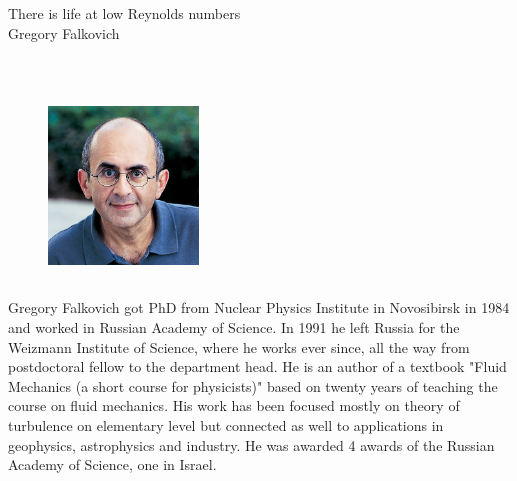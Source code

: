     { 
			{There is life at low Reynolds numbers} \\ 			
    \normalfont\small Gregory Falkovich }
    
    {  \\    
    } 
      {  } 
	\vspace{1cm} 
	\begin{figure}
		\vspace{-20pt}
		\begin{center}
			\includegraphics[width=4cm,height=5cm,keepaspectratio]{invited_img/falkovich}
		\end{center}
		\vspace{-20pt}
		\vspace{-10pt}
	\end{figure}
	Gregory Falkovich got PhD from Nuclear Physics Institute in Novosibirsk in 1984 and worked in Russian Academy of Science. In 1991 he left Russia for the Weizmann Institute of Science, where he works ever since, all the way from postdoctoral fellow to the department head. He is an author of a textbook "Fluid Mechanics (a short course for physicists)" based on twenty years of teaching the course on fluid mechanics. His work has been focused mostly on theory of turbulence on elementary level but connected as well to applications in geophysics, astrophysics and industry. He was awarded 4 awards of the Russian Academy of Science, one in Israel.
	
